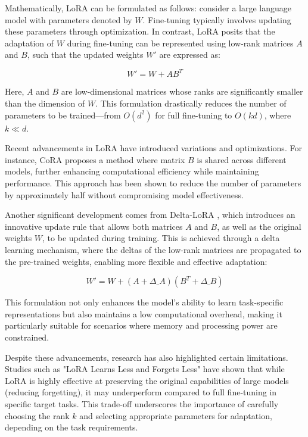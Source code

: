 \documentclass[conference]{IEEEtran}
\begin{document}
Mathematically, LoRA can be formulated as follows: consider a large language model with parameters denoted by \( W \). Fine-tuning typically involves updating these parameters through optimization. In contrast, LoRA posits that the adaptation of \( W \) during fine-tuning can be represented using low-rank matrices \( A \) and \( B \), such that the updated weights \( W' \) are expressed as:

\[
W' = W + AB^T
\]

Here, \( A \) and \( B \) are low-dimensional matrices whose ranks are significantly smaller than the dimension of \( W \). This formulation drastically reduces the number of parameters to be trained—from \( O(d^2) \) for full fine-tuning to \( O(kd) \), where \( k \ll d \).

Recent advancements in LoRA have introduced variations and optimizations. For instance, CoRA \cite{bX} proposes a method where matrix \( B \) is shared across different models, further enhancing computational efficiency while maintaining performance. This approach has been shown to reduce the number of parameters by approximately half without compromising model effectiveness.

Another significant development comes from Delta-LoRA \cite{bX}, which introduces an innovative update rule that allows both matrices \( A \) and \( B \), as well as the original weights \( W \), to be updated during training. This is achieved through a delta learning mechanism, where the deltas of the low-rank matrices are propagated to the pre-trained weights, enabling more flexible and effective adaptation:

\[
W' = W + (A + \Delta\_A)(B^T + \Delta\_B)
\]

This formulation not only enhances the model's ability to learn task-specific representations but also maintains a low computational overhead, making it particularly suitable for scenarios where memory and processing power are constrained.

Despite these advancements, research has also highlighted certain limitations. Studies such as "LoRA Learns Less and Forgets Less" \cite{bX} have shown that while LoRA is highly effective at preserving the original capabilities of large models (reducing forgetting), it may underperform compared to full fine-tuning in specific target tasks. This trade-off underscores the importance of carefully choosing the rank \( k \) and selecting appropriate parameters for adaptation, depending on the task requirements.
\end{document}
